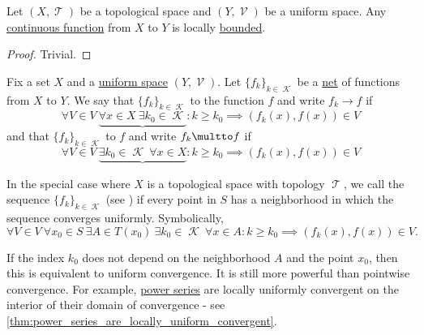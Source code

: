 \begin{proposition}\label{thm:continuous_implies_locally_bounded}
  Let \( (X, \mscrT) \) be a topological space and \( (Y, \mscrV) \) be a uniform space. Any \hyperref[thm:uniform_space_local_convergence/topological_source]{continuous function} from \( X \) to \( Y \) is locally \hyperref[def:bounded_function/locally_bounded]{bounded}.
\end{proposition}
\begin{proof}
  Trivial.
\end{proof}

\begin{definition}\label{def:function_net_convergence}
  Fix a set \( X \) and a \hyperref[def:uniform_space]{uniform space} \( (Y, \mscrV) \). Let \( \{ f_k \}_{k \in \mscrK} \) be a \hyperref[def:topological_net]{net} of functions from \( X \) to \( Y \). We say that \( \{ f_k \}_{k \in \mscrK} \)  to the function \( f \) and write \( f_k \to f \) if
  \begin{equation}\label{def:function_net_convergence/pointwise}
    \forall V \in V \ \underbrace{\forall x \in X \ \exists k_0 \in \mscrK} : k \geq k_0 \implies (f_k(x), f(x)) \in V
  \end{equation}
  and that \( \{ f_k \}_{k \in \mscrK} \)  to \( f \) and write \( f_k \multto f \) if
  \begin{equation}\label{def:function_net_convergence/uniform}
    \forall V \in V \ \underbrace{\exists k_0 \in \mscrK \ \forall x \in X} : k \geq k_0 \implies (f_k(x), f(x)) \in V
  \end{equation}

  In the special case where \( X \) is a topological space with topology \( \mscrT \), we call the sequence \( \{ f_k \}_{k \in \mscrK} \)  (see \cite{ProofWiki:locally_uniform_convergence}) if every point in \( S \) has a neighborhood in which the sequence converges uniformly. Symbolically,
  \begin{equation}\label{def:function_net_convergence/locally_uniform}
    \forall V \in V \ \forall x_0 \in S \ \exists A \in T(x_0) \ \exists k_0 \in \mscrK \ \forall x \in A : k \geq k_0 \implies (f_k(x), f(x)) \in V.
  \end{equation}

  If the index \( k_0 \) does not depend on the neighborhood \( A \) and the point \( x_0 \), then this is equivalent to uniform convergence. It is still more powerful than pointwise convergence. For example, \hyperref[def:convergent_power_series]{power series} are locally uniformly convergent on the interior of their domain of convergence - see \cref{thm:power_series_are_locally_uniform_convergent}.


\end{definition}
